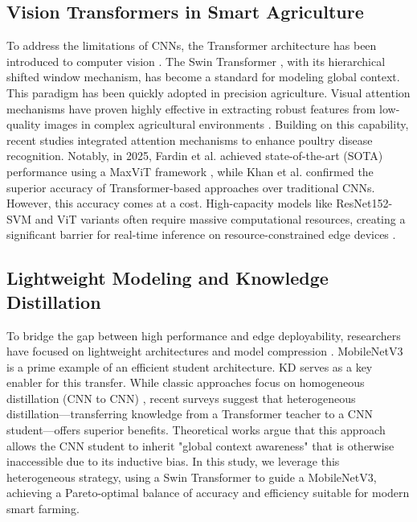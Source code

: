 \documentclass[review]{elsarticle}
\begin{document}
\subsection{Vision Transformers in Smart Agriculture}
To address the limitations of CNNs, the Transformer architecture has been introduced to computer vision \cite{dosovitskiy2020image}.
The Swin Transformer \cite{liu2021swin}, with its hierarchical shifted window mechanism, has become a standard for modeling global context.
This paradigm has been quickly adopted in precision agriculture. Visual attention mechanisms have proven highly effective in extracting robust features from low-quality images in complex agricultural environments \cite{jiang2022fusion}. Building on this capability, recent studies \cite{li2023attention, he2023reliable} integrated attention mechanisms to enhance poultry disease recognition. Notably, in 2025, Fardin et al. \cite{fardin2025robust} achieved state-of-the-art (SOTA) performance using a MaxViT framework \cite{tu2022maxvit}, while Khan et al. \cite{khan2025assessment} confirmed the superior accuracy of Transformer-based approaches over traditional CNNs.
However, this accuracy comes at a cost. High-capacity models like ResNet152-SVM \cite{luo2025optimizing} and ViT variants often require massive computational resources, creating a significant barrier for real-time inference on resource-constrained edge devices \cite{zhang2023edge}.

\subsection{Lightweight Modeling and Knowledge Distillation}
To bridge the gap between high performance and edge deployability, researchers have focused on lightweight architectures and model compression \cite{chen2023lightweight, srivastava2023deep}.
MobileNetV3 \cite{howard2019searching} is a prime example of an efficient student architecture.
KD \cite{hinton2015distilling} serves as a key enabler for this transfer.
While classic approaches focus on homogeneous distillation (CNN to CNN) \cite{romero2014fitnets, zhao2024lightweight}, recent surveys \cite{gou2021knowledge, arxiv2025survey} suggest that heterogeneous distillation—transferring knowledge from a Transformer teacher to a CNN student—offers superior benefits.
Theoretical works \cite{raghu2021vision, yuan2020revisiting, d2021convit} argue that this approach allows the CNN student to inherit "global context awareness" that is otherwise inaccessible due to its inductive bias.
In this study, we leverage this heterogeneous strategy, using a Swin Transformer to guide a MobileNetV3, achieving a Pareto-optimal balance of accuracy and efficiency suitable for modern smart farming.
\end{document}
